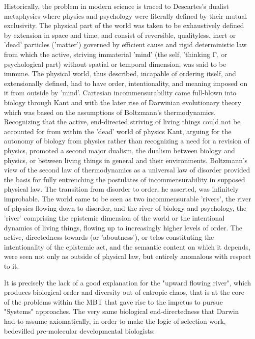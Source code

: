 \begin{longquote}
Historically, the problem in modern science is traced to Descartes's
dualist metaphysics where physics and psychology were literally defined
by their mutual exclusivity. The physical part of the world was taken to be
exhaustively defined by extension in space and time, and consist of
reversible, qualityless, inert or 'dead' particles ('matter') governed by
efficient cause and rigid deterministic law from which the active, striving
immaterial 'mind' (the self, 'thinking Γ, or psychological part) without
spatial or temporal dimension, was said to be immune. The physical
world, thus described, incapable of ordering itself, and extensionally
defined, had to have order, intentionality, and meaning imposed on it
from outside by 'mind'. Cartesian incommensurability came full-blown
into biology through Kant and with the later rise of Darwinian
evolutionary theory which was based on the assumptions of
Boltzmann's thermodynamics. Recognizing that the active, end-directed
striving of living things could not be accounted for from within the 'dead'
world of physics Kant, arguing for the autonomy of biology from physics
rather than recognizing a need for a revision of physics, promoted a
second major dualism, the dualism between biology and physics, or
between living things in general and their environments. Boltzmann's view
of the second law of thermodynamics as a universal law of disorder
provided the basis for fully entrenching the postulates of incommensurability in supposed physical law. The transition from disorder to order,
he asserted, was infinitely improbable. The world came to be seen as two
incommensurable 'rivers', the river of physics flowing down to disorder,
and the river of biology and psychology, the 'river' comprising the
epistemic dimension of the world or the intentional dynamics of living
things, flowing up to increasingly higher levels of order. The active,
directedness towards (or 'aboutness'), or telos constituting the intentionality of the epistemic act, and the semantic content on which it depends,
were seen not only as outside of physical law, but entirely anomalous with
respect to it.
\cite{Swenson1999}
\end{longquote}

It is precisely the lack of a good explanation for the "upward flowing river", which produces biological order and diversity out of entropic chaos, that is at the core of the problems within the MBT that gave rise to the impetus to pursue "Systems" approaches. The very same biological end-directedness that Darwin had to assume axiomatically, in order to make the logic of selection work, bedevilled pre-molecular developmental biologists:

